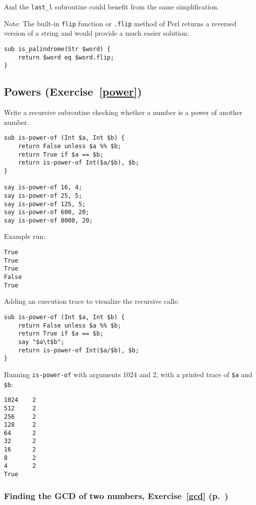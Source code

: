And the \verb'last_l' subroutine could benefit from the same 
simplification.

Note: The built-in {\tt flip} function or {\tt .flip} method 
of Perl returns a reversed version of a string and would 
provide a much easier solution:

\begin{verbatim}
sub is_palindrome(Str $word) {
    return $word eq $word.flip;
}
\end{verbatim}

\subsection{Powers (Exercise~\ref{power})}
\label{sol_power}

Write a recursive subroutine checking whether a number is a power of another number.

\begin{verbatim}
sub is-power-of (Int $a, Int $b) {
    return False unless $a %% $b;
    return True if $a == $b;
    return is-power-of Int($a/$b), $b;
}

say is-power-of 16, 4;
say is-power-of 25, 5;
say is-power-of 125, 5;
say is-power-of 600, 20;
say is-power-of 8000, 20;
\end{verbatim}
%

Example run:
\begin{verbatim}
True
True
True
False
True
\end{verbatim}

Adding an execution trace to visualize the recursive calls:

\begin{verbatim}
sub is-power-of (Int $a, Int $b) {     
    return False unless $a %% $b;      
    return True if $a == $b;           
    say "$a\t$b";                      
    return is-power-of Int($a/$b), $b; 
}                                      
\end{verbatim}

Running {\tt is-power-of} with arguments 1024 and 2, 
with a printed trace of \verb'$a' and \verb'$b':

\begin{verbatim}
1024    2
512     2
256     2
128     2
64      2
32      2
16      2
8       2
4       2
True
\end{verbatim}
%

\subsubsection{Finding the GCD of two numbers, Exercise~\ref{gcd} (p.~\pageref{gcd})}
\label{sol_gcd}

